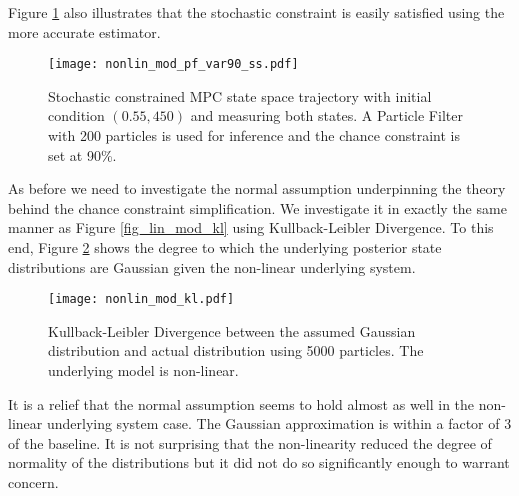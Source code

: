Figure \ref{fig_nonlin_mod_pf_var90_ss} also illustrates that the stochastic constraint is easily satisfied using the more accurate estimator.
\begin{figure}[H] 
\centering
\texttt{[image: nonlin\_mod\_pf\_var90\_ss.pdf]}
\caption{Stochastic constrained MPC state space trajectory with initial condition $(0.55, 450)$ and measuring both states. A Particle Filter with 200 particles is used for inference and the chance constraint is set at 90\%.}
\label{fig_nonlin_mod_pf_var90_ss}
\end{figure}
As before we need to investigate the normal assumption underpinning the theory behind the chance constraint simplification. We investigate it in exactly the same manner as Figure \ref{fig_lin_mod_kl} using Kullback-Leibler Divergence. To this end, Figure \ref{fig_nonlin_mod_kl} shows the degree to which the underlying posterior state distributions are Gaussian given the non-linear underlying system.
\begin{figure}[H] 
\centering
\texttt{[image: nonlin\_mod\_kl.pdf]}
\caption{Kullback-Leibler Divergence between the assumed Gaussian distribution and actual distribution using 5000 particles. The underlying model is non-linear.}
\label{fig_nonlin_mod_kl}
\end{figure}
It is a relief that the normal assumption seems to hold almost as well in the non-linear underlying system case. The Gaussian approximation is within a factor of 3 of the baseline. It is not surprising that the non-linearity reduced the degree of normality of the distributions but it did not do so significantly enough to warrant concern.
